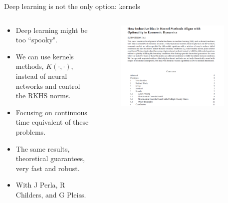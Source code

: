 \documentclass[aspectratio=169,10pt]{beamer}
\begin{document}
\begin{frame}{Deep learning is not the only option: kernels}
\begin{columns}
	\begin{column}{0.5\textwidth}
			\begin{itemize}
			\item Deep learning might be too ``spooky".
			\smallskip
			\item We can use kernels methods, $K(\cdot,\cdot)$, instead of neural networks and control the RKHS norms.
			\item Focusing on continuous time equivalent of these problems.  
			\item The same results, theoretical guarantees, very fast and robust.
			\item With J Perla, R Childers, and G Pleiss.
		\end{itemize}
	\end{column}
	\begin{column}{0.5\textwidth}
		\begin{figure}[t!]
			\centering
			\includegraphics[width=0.9\textwidth]{figs/Kernel}
			\vspace{-7mm}
		\end{figure}
	\end{column}
\end{columns}

\end{frame}
\end{document}
